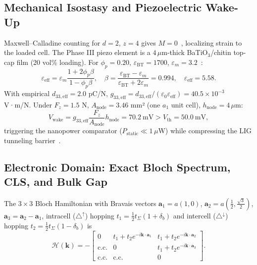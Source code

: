 \documentclass[11pt,a4paper]{article}
\theoremstyle{definition}
\theoremstyle{remark}
\begin{document}
\subsection{Mechanical Isostasy and Piezoelectric Wake-Up}
Maxwell--Calladine counting for $d=2$, $z=4$ gives $M = 0$~\cite{maxwell1864,guest2003}, localizing strain to the loaded cell. The Phase III piezo element is a $4\,\mu$m-thick BaTiO$_3$/chitin top-cap film (20 vol\% loading). For $\phi_p = 0.20$, $\varepsilon_{\text{BT}} = 1700$, $\varepsilon_m = 3.2$~\cite{yamada1982}:
\begin{equation}
\varepsilon_{\text{eff}} = \varepsilon_m \frac{1 + 2\phi_p\beta}{1-\phi_p\beta},\quad \beta = \frac{\varepsilon_{\text{BT}}-\varepsilon_m}{\varepsilon_{\text{BT}}+2\varepsilon_m} = 0.994,\quad \varepsilon_{\text{eff}} = 5.58.
\end{equation}
With empirical $d_{33,\text{eff}} = 2.0$ pC/N, $g_{33,\text{eff}} = d_{33,\text{eff}}/(\varepsilon_0\varepsilon_{\text{eff}}) = 40.5\times 10^{-3}$ V·m/N. Under $F_z = 1.5$ N, $A_{\text{node}} = 3.46$ mm² (one $a_1$ unit cell), $h_{\text{node}} = 4\,\mu$m:
\begin{equation}
V_{\text{wake}} = g_{33,\text{eff}}\frac{F_z}{A_{\text{node}}}h_{\text{node}} = 70.2\ \text{mV} > V_{\text{th}} = 50.0\ \text{mV},
\end{equation}
triggering the nanopower comparator ($P_{\text{static}} \ll 1\,\mu$W) while compressing the LIG tunneling barrier~\cite{simmons1963}.

\subsection{Electronic Domain: Exact Bloch Spectrum, CLS, and Bulk Gap}
The $3\times 3$ Bloch Hamiltonian with Bravais vectors $\mathbf{a}_1 = a(1,0)$, $\mathbf{a}_2 = a(\tfrac{1}{2},\tfrac{\sqrt3}{2})$, $\mathbf{a}_3 = \mathbf{a}_2 - \mathbf{a}_1$, intracell ($\triangle^{\uparrow}$) hopping $t_1 = \tfrac12 t_\Sigma(1+\delta_b)$ and intercell ($\triangle^{\downarrow}$) hopping $t_2 = \tfrac12 t_\Sigma(1-\delta_b)$ is~\cite{ezawa2018,kempkes2019}
\begin{equation}
\mathcal{H}(\mathbf{k}) = -\begin{bmatrix}
0 & t_1+t_2e^{-i\mathbf{k}\cdot\mathbf{a}_1} & t_1+t_2e^{-i\mathbf{k}\cdot\mathbf{a}_2}\\
\text{c.c.} & 0 & t_1+t_2e^{-i\mathbf{k}\cdot\mathbf{a}_3}\\
\text{c.c.} & \text{c.c.} & 0
\end{bmatrix}.
\end{equation}
\end{document}
